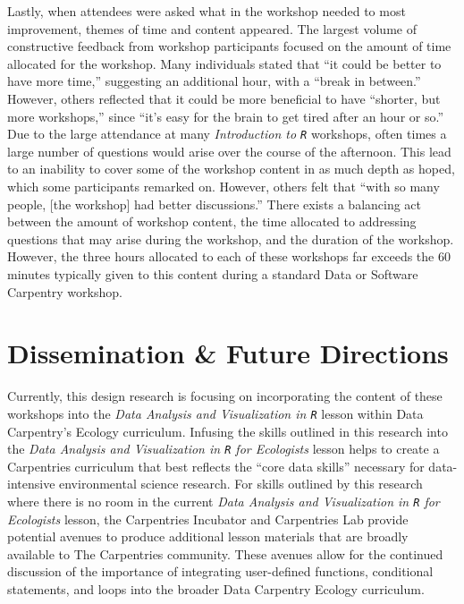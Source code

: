 \documentclass[12pt]{article}
\begin{document}
\quad Lastly, when attendees were asked what in the workshop needed to most improvement, themes of time and content appeared. The largest volume of constructive feedback from workshop participants focused on the amount of time allocated for the workshop. Many individuals stated that ``it could be better to have more time,'' suggesting an additional hour, with a ``break in between.'' However, others reflected that it could be more beneficial to have ``shorter, but more workshops,'' since ``it's easy for the brain to get tired after an hour or so.'' Due to the large attendance at many \emph{Introduction to \texttt{R}} workshops, often times a large number of questions would arise over the course of the afternoon. This lead to an inability to cover some of the workshop content in as much depth as hoped, which some participants remarked on. However, others felt that ``with so many people, [the workshop] had better discussions.'' There exists a balancing act between the amount of workshop content, the time allocated to addressing questions that may arise during the workshop, and the duration of the workshop. However, the three hours allocated to each of these workshops far exceeds the 60 minutes typically given to this content during a standard Data or Software Carpentry workshop. 

\section{Dissemination \& Future Directions} 

\quad Currently, this design research is focusing on incorporating the content of these workshops into the \emph{Data Analysis and Visualization in \texttt{R}} lesson within Data Carpentry's Ecology curriculum. Infusing the skills outlined in this research into the \emph{Data Analysis and Visualization in \texttt{R} for Ecologists} lesson helps to create a Carpentries curriculum that best reflects the ``core data skills'' necessary for data-intensive environmental science research. For skills outlined by this research where there is no room in the current \emph{Data Analysis and Visualization in \texttt{R} for Ecologists} lesson, the Carpentries Incubator and Carpentries Lab provide potential avenues to produce additional lesson materials that are broadly available to The Carpentries community. These avenues allow for the continued discussion of the importance of integrating user-defined functions, conditional statements, and loops into the broader Data Carpentry Ecology curriculum.    
\end{document}
